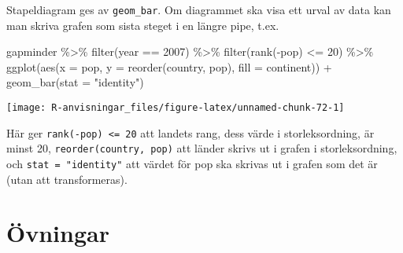 \documentclass[
]{book}
\newenvironment{Shaded}{\begin{snugshade}}{\end{snugshade}}
\newcommand{\AttributeTok}[1]{\textcolor[rgb]{0.77,0.63,0.00}{#1}}
\newcommand{\DecValTok}[1]{\textcolor[rgb]{0.00,0.00,0.81}{#1}}
\newcommand{\FunctionTok}[1]{\textcolor[rgb]{0.00,0.00,0.00}{#1}}
\newcommand{\NormalTok}[1]{#1}
\newcommand{\SpecialCharTok}[1]{\textcolor[rgb]{0.00,0.00,0.00}{#1}}
\newcommand{\StringTok}[1]{\textcolor[rgb]{0.31,0.60,0.02}{#1}}
\theoremstyle{definition}
\theoremstyle{definition}
\theoremstyle{definition}
\theoremstyle{definition}
\theoremstyle{remark}
\begin{document}
Stapeldiagram ges av \texttt{geom\_bar}. Om diagrammet ska visa ett urval av data kan man skriva grafen som sista steget i en längre pipe, t.ex.

\begin{Shaded}
\begin{Highlighting}[]
\NormalTok{gapminder }\SpecialCharTok{\%\textgreater{}\%} 
  \FunctionTok{filter}\NormalTok{(year }\SpecialCharTok{==} \DecValTok{2007}\NormalTok{) }\SpecialCharTok{\%\textgreater{}\%} 
  \FunctionTok{filter}\NormalTok{(}\FunctionTok{rank}\NormalTok{(}\SpecialCharTok{{-}}\NormalTok{pop) }\SpecialCharTok{\textless{}=} \DecValTok{20}\NormalTok{) }\SpecialCharTok{\%\textgreater{}\%} 
  \FunctionTok{ggplot}\NormalTok{(}\FunctionTok{aes}\NormalTok{(}\AttributeTok{x =}\NormalTok{ pop, }\AttributeTok{y =} \FunctionTok{reorder}\NormalTok{(country, pop), }\AttributeTok{fill =}\NormalTok{ continent)) }\SpecialCharTok{+}
  \FunctionTok{geom\_bar}\NormalTok{(}\AttributeTok{stat =} \StringTok{"identity"}\NormalTok{)}
\end{Highlighting}
\end{Shaded}

\begin{center}\texttt{[image: R-anvisningar\_files/figure-latex/unnamed-chunk-72-1]} \end{center}

Här ger \texttt{rank(-pop)\ \textless{}=\ 20} att landets rang, dess värde i storleksordning, är minst 20, \texttt{reorder(country,\ pop)} att länder skrivs ut i grafen i storleksordning, och \texttt{stat\ =\ "identity"} att värdet för pop ska skrivas ut i grafen som det är (utan att transformeras).

\hypertarget{uxf6vningar-1}{%
\section{Övningar}\label{uxf6vningar-1}}
\end{document}
